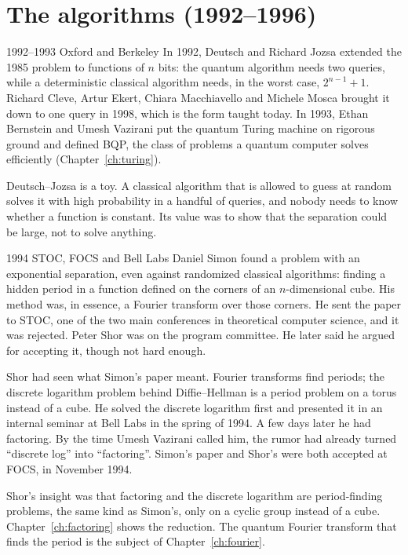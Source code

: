 \section{The algorithms (1992--1996)}

\begin{history}{1992--1993 \textperiodcentered{} Oxford and Berkeley}
In 1992, Deutsch and Richard Jozsa extended the 1985 problem to functions of $n$
bits: the quantum algorithm needs two queries, while a deterministic classical
algorithm needs, in the worst case, $2^{n-1}+1$. Richard Cleve, Artur Ekert,
Chiara Macchiavello and Michele Mosca brought it down to one query in 1998,
which is the form taught today. In 1993,
Ethan Bernstein and Umesh Vazirani put the quantum Turing machine on rigorous
ground and defined BQP, the class of problems a quantum computer solves
efficiently (Chapter~\ref{ch:turing}).
\end{history}

Deutsch--Jozsa is a toy. A classical algorithm that is allowed to guess at random
solves it with high probability in a handful of queries, and nobody needs to know
whether a function is constant. Its value was to show that the separation could
be large, not to solve anything.

\begin{history}{1994 \textperiodcentered{} STOC, FOCS and Bell Labs}
Daniel Simon found a problem with an exponential separation, even against
randomized classical algorithms: finding a hidden period in a function defined
on the corners of an $n$-dimensional cube. His method was, in essence, a Fourier
transform over those corners. He sent the paper to STOC, one of the two main
conferences in theoretical computer science, and it was rejected. Peter Shor was
on the program committee. He later said he argued for accepting it, though not
hard enough.

Shor had seen what Simon's paper meant. Fourier transforms find periods; the
discrete logarithm problem behind Diffie--Hellman is a period problem on a torus
instead of a cube. He solved the discrete logarithm first and presented it in an
internal seminar at Bell Labs in the spring of 1994. A few days later he had
factoring.
By the time Umesh Vazirani called him, the rumor had already turned ``discrete
log'' into ``factoring''. Simon's paper and Shor's were both accepted at FOCS, in
November 1994.
\end{history}

Shor's insight was that factoring and the discrete logarithm are period-finding
problems, the same kind as Simon's, only on a cyclic group instead of a cube.
Chapter~\ref{ch:factoring} shows the reduction. The quantum Fourier transform that finds the
period is the subject of Chapter~\ref{ch:fourier}.

